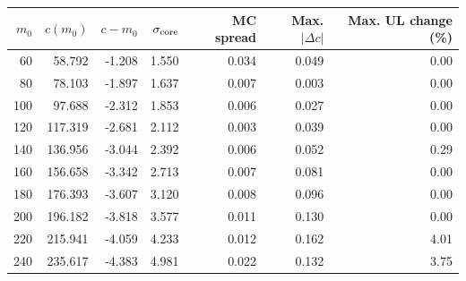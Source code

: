 \begin{tabular}{rrrrrrr}
\toprule
$m_0$ & $c(m_0)$ & $c-m_0$ & $\sigma_{\rm core}$ & MC spread & Max. $|\Delta c|$ & Max. UL change (\%) \\
\midrule
60 & 58.792 & -1.208 & 1.550 & 0.034 & 0.049 & 0.00 \\
80 & 78.103 & -1.897 & 1.637 & 0.007 & 0.003 & 0.00 \\
100 & 97.688 & -2.312 & 1.853 & 0.006 & 0.027 & 0.00 \\
120 & 117.319 & -2.681 & 2.112 & 0.003 & 0.039 & 0.00 \\
140 & 136.956 & -3.044 & 2.392 & 0.006 & 0.052 & 0.29 \\
160 & 156.658 & -3.342 & 2.713 & 0.007 & 0.081 & 0.00 \\
180 & 176.393 & -3.607 & 3.120 & 0.008 & 0.096 & 0.00 \\
200 & 196.182 & -3.818 & 3.577 & 0.011 & 0.130 & 0.00 \\
220 & 215.941 & -4.059 & 4.233 & 0.012 & 0.162 & 4.01 \\
240 & 235.617 & -4.383 & 4.981 & 0.022 & 0.132 & 3.75 \\
\bottomrule
\end{tabular}

